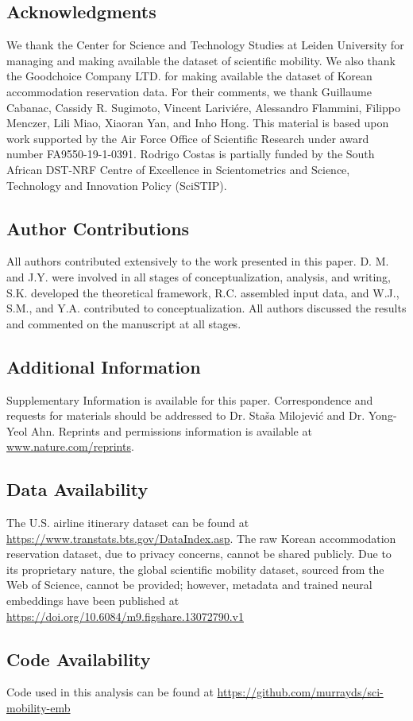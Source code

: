 \documentclass[12pt]{article} %
\begin{document}
%
%
\subsection*{Acknowledgments}
We thank the Center for Science and Technology Studies at Leiden University for managing and making available the dataset of scientific mobility. We also thank the  Goodchoice Company LTD. for making available the dataset of Korean accommodation reservation data.
For their comments, we thank Guillaume Cabanac, Cassidy R. Sugimoto, Vincent Lariviére, Alessandro Flammini, Filippo Menczer, Lili Miao, Xiaoran Yan, and Inho Hong.
This material is based upon work supported by the Air Force Office of Scientific Research under award number FA9550-19-1-0391.
Rodrigo Costas is partially funded by the South African DST-NRF Centre of Excellence in Scientometrics and Science, Technology and Innovation Policy (SciSTIP).


%
%
\subsection*{Author Contributions}
All authors contributed extensively to the work presented in this paper.
D. M. and J.Y. were involved in all stages of conceptualization, analysis, and writing, S.K. developed the theoretical framework, R.C. assembled input data, and W.J., S.M., and Y.A. contributed to conceptualization.
All authors discussed the results and commented on the manuscript at all stages.


%
%
\subsection*{Additional Information}
Supplementary Information is available for this paper.
Correspondence and requests for materials should be addressed to Dr. Staša Milojević and Dr. Yong-Yeol Ahn.
Reprints and permissions information is available at
\url{www.nature.com/reprints}.


\subsection*{Data Availability}
The U.S. airline itinerary dataset can be found at \url{https://www.transtats.bts.gov/DataIndex.asp}.
The raw Korean accommodation reservation dataset, due to privacy concerns, cannot be shared publicly.
Due to its proprietary nature, the global scientific mobility dataset, sourced from the Web of Science, cannot be provided;
however, metadata and trained neural embeddings have been published at \url{https://doi.org/10.6084/m9.figshare.13072790.v1}

\subsection*{Code Availability}
Code used in this analysis can be found at \url{https://github.com/murrayds/sci-mobility-emb}


\printbibliography{}
\end{document}
